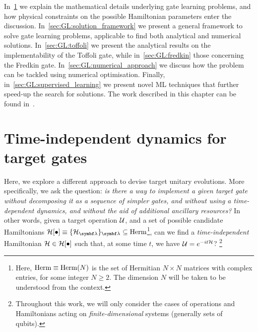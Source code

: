 In~\cref{sec:GL:problem_details} we explain the mathematical details underlying gate learning problems, and how physical constraints on the possible Hamiltonian parameters enter the discussion. In~\cref{sec:GL:solution_framework} we present a general framework to solve gate learning problems, applicable to find both analytical and numerical solutions.
In~\cref{sec:GL:toffoli} we present the analytical results on the implementability of the Toffoli gate, while in~\cref{sec:GL:fredkin} those concerning the Fredkin gate.
In~\cref{sec:GL:numerical_approach} we discuss how the problem can be tackled using numerical optimisation.
Finally, in~\cref{sec:GL:supervised_learning} we present novel \ac{ML} techniques that further speed-up the search for solutions.
The work described in this chapter can be found in~\cite{innocenti2018approximate,innocenti2018supervised}.


\section{Time-independent dynamics for target gates}
\label{sec:GL:problem_details}

\newcommand{\setOfHamiltonians}{\calH[\bullet]}

Here, we explore a different approach to devise target unitary evolutions. More specifically, we ask the question: \emph{is there a way to implement a given target gate \emph{without} decomposing it as a sequence of simpler gates, \emph{and} without using a time-dependent dynamics, \emph{and} without the aid of additional ancillary resources?}
In other words, given a target operation ${\mathcal{U}}$, and a set of possible candidate Hamiltonians $\setOfHamiltonians\equiv \{\calH_{\bslambda}\}_{\bslambda}\subseteq\on{Herm}$\footnote{Here, $\operatorname{Herm}\equiv\operatorname{Herm}(N)$ is the set of Hermitian $N\times N$ matrices with complex entries, for some integer $N\ge2$. The dimension $N$ will be taken to be understood from the context.},
can we find a \emph{time-independent} Hamiltonian $\calH\in\setOfHamiltonians$ such that, at some time $t$, we have ${\mathcal{U}} = e^{-it {\mathcal{H}}}$?
\footnote{Throughout this work, we will only consider the cases of operations and Hamiltonians acting on \emph{finite-dimensional} systems (generally sets of qubits).}

